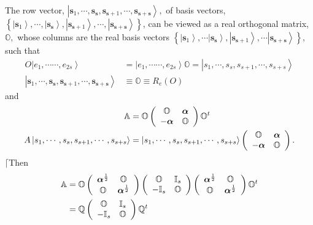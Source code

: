 \documentclass[aps,preprint]{revtex4}%
\begin{document}
The row vector, $\left\vert \mathbf{s}_{1},\cdots,\mathbf{s}_{\mathbf{s}%
},\mathbf{s}_{\mathbf{s}+1},\cdots,\mathbf{s}_{\mathbf{s}+\mathbf{s}%
}\right\rangle ,$ of basis vectors, $\left\{  \left\vert \mathbf{s}%
_{1}\right\rangle ,\cdots,\left\vert \mathbf{s}_{\mathbf{s}}\right\rangle
,\left\vert \mathbf{s}_{\mathbf{s}+1}\right\rangle ,\cdots,\left\vert
\mathbf{s}_{\mathbf{s}+\mathbf{s}}\right\rangle \right\}  $, can be viewed as
a real orthogonal matrix, $\mathbb{O},$ whose columns are the real basis
vectors $\left\{  \left\vert \mathbf{s}_{1}\right\rangle ,\cdots\left\vert
\mathbf{s}_{\mathbf{s}}\right\rangle ,\left\vert \mathbf{s}_{\mathbf{s}%
+1}\right\rangle ,\cdots\left\vert \mathbf{s}_{\mathbf{s}+\mathbf{s}%
}\right\rangle \right\}  ,$ such that
\begin{align}
O\left\vert e_{1},\cdots\cdots,e_{2s}\right\rangle  &  =\left\vert
e_{1},\cdots\cdots,e_{2s}\right\rangle \mathbb{O}=\left\vert s_{1}%
,\cdots,s_{s},s_{s+1},\cdots,s_{s+s}\right\rangle \\
\left\vert \mathbf{s}_{1},\cdots,\mathbf{s}_{\mathbf{s}},\mathbf{s}%
_{\mathbf{s}+1},\cdots,\mathbf{s}_{\mathbf{s}+\mathbf{s}}\right\rangle  &
\equiv\mathbb{O}\equiv R_{e}\left(  O\right)
\end{align}
and
\begin{align}
\mathbb{A}  &  =\mathbb{O}\left(
\begin{array}
[c]{cc}%
\mathbb{O} & \boldsymbol{\alpha}\\
-\boldsymbol{\alpha} & \mathbb{O}%
\end{array}
\right)  \mathbb{O}^{t}\\
A\left\vert s_{1},\cdots,s_{s},s_{s+1},\cdots,s_{s+s}\right\rangle  &
=\left\vert s_{1},\cdots,s_{s},s_{s+1},\cdots,s_{s+s}\right\rangle \left(
\begin{array}
[c]{cc}%
\mathbb{O} & \boldsymbol{\alpha}\\
-\boldsymbol{\alpha} & \mathbb{O}%
\end{array}
\right)  .
\end{align}
$\lceil$Then%
\begin{align}
\mathbb{A}  &  =\mathbb{O}\left(
\begin{array}
[c]{cc}%
\boldsymbol{\alpha}^{\frac{1}{2}} & \mathbb{O}\\
\mathbb{O} & \boldsymbol{\alpha}^{\frac{1}{2}}%
\end{array}
\right)  \left(
\begin{array}
[c]{cc}%
\mathbb{O} & \mathbb{I}_{s}\\
-\mathbb{I}_{s} & \mathbb{O}%
\end{array}
\right)  \left(
\begin{array}
[c]{cc}%
\boldsymbol{\alpha}^{\frac{1}{2}} & \mathbb{O}\\
\mathbb{O} & \boldsymbol{\alpha}^{\frac{1}{2}}%
\end{array}
\right)  \mathbb{O}^{t}\\
&  =\mathbb{Q}\left(
\begin{array}
[c]{cc}%
\mathbb{O} & \mathbb{I}_{s}\\
-\mathbb{I}_{s} & \mathbb{O}%
\end{array}
\right)  \mathbb{Q}^{t}%
\end{align}
\end{document}

